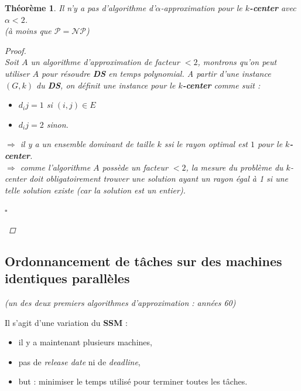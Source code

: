 \documentclass{article}
\newcommand{\titre}[1]{\textcolor{title}{#1}}
\newcommand{\cqfd}{\begin{flushright}$\square$\end{flushright}}
\newtheorem{thm}{Th\'eor\`eme}[section]
\newtheorem{proof}{Preuve}[section]
\begin{document}
\begin{sffamily}
\begin{thm}Il n'y a pas d'algorithme d'$\alpha$-approximation pour le \textbf{$k$-center} avec $\alpha <2$.\\ (à moins que $\mathcal{P} =
\mathcal{NP}$)
\begin{proof}$ $\\
Soit $A$ un algorithme d'approximation de facteur $<2$, montrons qu'on peut utiliser $A$ pour résoudre \textbf{\titre{DS}} en temps
polynomial. A partir d'une instance $(G,k)$ du \textbf{\titre{DS}}, on définit une instance pour le \textbf{$k$-center} comme suit :
\begin{itemize}
\item [$\bigstar$]$d_ij = 1$ si $(i,j) \in E$
\item [$\bigstar$]$d_ij = 2$ sinon.
\end{itemize}
$\Rightarrow$ il y a un ensemble dominant de taille $k$ ssi le rayon optimal est $1$ pour le \textbf{$k$-center}.\\
$\Rightarrow$ comme l'algorithme $A$ possède un facteur $< 2$, la mesure du problème du $k$-center doit obligatoirement trouver une
solution ayant un rayon égal à 1 si une telle solution existe \textit{(car la solution est un entier)}.
\cqfd
\end{proof}
\end{thm}

\newpage

\subsection{Ordonnancement de tâches sur des machines identiques parallèles}

\begin{flushright}\textit{(un des deux premiers algorithmes d'approximation : années 60)}\end{flushright}

Il s'agit d'une variation du \textbf{\titre{SSM}} :
\begin{itemize}
\item il y a maintenant plusieurs machines,
\item pas de \textit{release date} ni de \textit{deadline},
\item but : minimiser le temps utilisé pour terminer toutes les tâches.
\end{itemize}


\end{sffamily}
\end{document}
